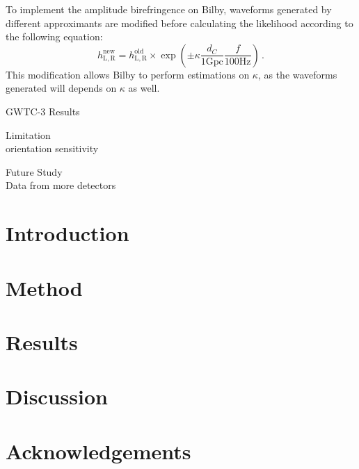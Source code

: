 \documentclass[twocolumn]{aastex631}
\begin{document}
To implement the amplitude birefringence on Bilby, waveforms generated by different approximants are modified before calculating the likelihood according to the following equation:
\begin{equation}
    h_\mathrm{L,R}^{\mathrm{new}}=
    h_\mathrm{L,R}^{\mathrm{old}}\times
    \exp\left(\pm\kappa\frac{d_C}{1\mathrm{ Gpc}}\frac{f}{100\mathrm{ Hz}}\right)\,.
\end{equation}
This modification allows Bilby to perform estimations on $\kappa$, as the waveforms generated will depends on $\kappa$ as well.

GWTC-3 Results

Limitation\\
orientation
sensitivity

Future Study\\
Data from more detectors

\section{Introduction}



\section{Method}



\section{Results}



\section{Discussion}



\section{Acknowledgements}




\end{document}
